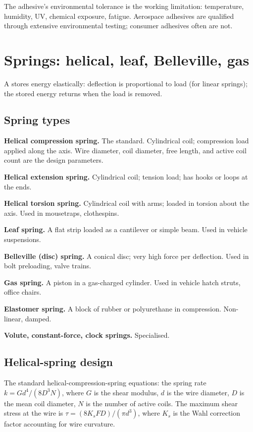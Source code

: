 The adhesive's environmental tolerance is the working limitation: temperature, humidity, UV, chemical exposure, fatigue. Aerospace adhesives are qualified through extensive environmental testing; consumer adhesives often are not.

\section{Springs: helical, leaf, Belleville, gas}

A  stores energy elastically: deflection is proportional to load (for linear springs); the stored energy returns when the load is removed.

\subsection{Spring types}

\textbf{Helical compression spring.} The standard. Cylindrical coil; compression load applied along the axis. Wire diameter, coil diameter, free length, and active coil count are the design parameters.

\textbf{Helical extension spring.} Cylindrical coil; tension load; has hooks or loops at the ends.

\textbf{Helical torsion spring.} Cylindrical coil with arms; loaded in torsion about the axis. Used in mousetraps, clothespins.

\textbf{Leaf spring.} A flat strip loaded as a cantilever or simple beam. Used in vehicle suspensions.

\textbf{Belleville (disc) spring.} A conical disc; very high force per deflection. Used in bolt preloading, valve trains.

\textbf{Gas spring.} A piston in a gas-charged cylinder. Used in vehicle hatch struts, office chairs.

\textbf{Elastomer spring.} A block of rubber or polyurethane in compression. Non-linear, damped.

\textbf{Volute, constant-force, clock springs.} Specialised.

\subsection{Helical-spring design}

The standard helical-compression-spring equations: the spring rate $k = G d^4 / (8 D^3 N)$, where $G$ is the shear modulus, $d$ is the wire diameter, $D$ is the mean coil diameter, $N$ is the number of active coils. The maximum shear stress at the wire is $\tau = (8 K_s F D)/(\pi d^3)$, where $K_s$ is the Wahl correction factor accounting for wire curvature.

